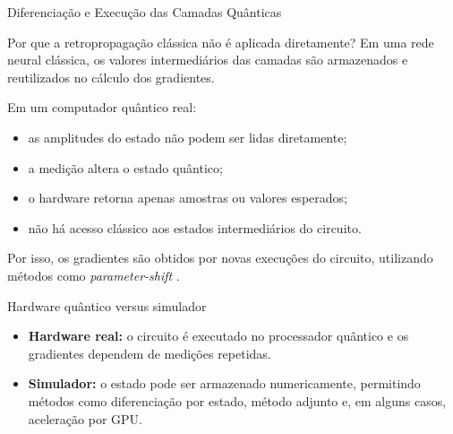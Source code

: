 \begin{frame}[shrink=10]{Diferenciação e Execução das Camadas Quânticas}

\begin{block}{Por que a retropropagação clássica não é aplicada diretamente?}
Em uma rede neural clássica, os valores intermediários das camadas são
armazenados e reutilizados no cálculo dos gradientes.

Em um computador quântico real:
\begin{itemize}
  \item as amplitudes do estado não podem ser lidas diretamente;
  \item a medição altera o estado quântico;
  \item o hardware retorna apenas amostras ou valores esperados;
  \item não há acesso clássico aos estados intermediários do circuito.
\end{itemize}

Por isso, os gradientes são obtidos por novas execuções do circuito,
utilizando métodos como \textit{parameter-shift} \cite{bergholm2018pennylane}.
\end{block}

\begin{alertblock}{Hardware quântico versus simulador}
\begin{itemize}
  \item \textbf{Hardware real:} o circuito é executado no processador
  quântico e os gradientes dependem de medições repetidas.

  \item \textbf{Simulador:} o estado pode ser armazenado numericamente,
  permitindo métodos como diferenciação por estado, método adjunto e,
  em alguns casos, aceleração por GPU.
\end{itemize}
\end{alertblock}

\end{frame}

